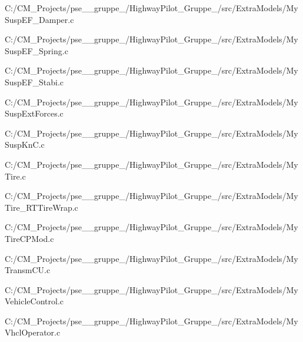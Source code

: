 \begin{DoxyCompactItemize}
C\+:/\+C\+M\+\_\+\+Projects/pse\+\_\+\_\+gruppe\+\_/\+Highway\+Pilot\+\_\+\+Gruppe\+\_/src/\+Extra\+Models/My\+Susp\+E\+F\+\_\+\+Damper.\+c\item 
C\+:/\+C\+M\+\_\+\+Projects/pse\+\_\+\_\+gruppe\+\_/\+Highway\+Pilot\+\_\+\+Gruppe\+\_/src/\+Extra\+Models/My\+Susp\+E\+F\+\_\+\+Spring.\+c\item 
C\+:/\+C\+M\+\_\+\+Projects/pse\+\_\+\_\+gruppe\+\_/\+Highway\+Pilot\+\_\+\+Gruppe\+\_/src/\+Extra\+Models/My\+Susp\+E\+F\+\_\+\+Stabi.\+c\item 
C\+:/\+C\+M\+\_\+\+Projects/pse\+\_\+\_\+gruppe\+\_/\+Highway\+Pilot\+\_\+\+Gruppe\+\_/src/\+Extra\+Models/My\+Susp\+Ext\+Forces.\+c\item 
C\+:/\+C\+M\+\_\+\+Projects/pse\+\_\+\_\+gruppe\+\_/\+Highway\+Pilot\+\_\+\+Gruppe\+\_/src/\+Extra\+Models/My\+Susp\+Kn\+C.\+c\item 
C\+:/\+C\+M\+\_\+\+Projects/pse\+\_\+\_\+gruppe\+\_/\+Highway\+Pilot\+\_\+\+Gruppe\+\_/src/\+Extra\+Models/My\+Tire.\+c\item 
C\+:/\+C\+M\+\_\+\+Projects/pse\+\_\+\_\+gruppe\+\_/\+Highway\+Pilot\+\_\+\+Gruppe\+\_/src/\+Extra\+Models/My\+Tire\+\_\+\+R\+T\+Tire\+Wrap.\+c\item 
C\+:/\+C\+M\+\_\+\+Projects/pse\+\_\+\_\+gruppe\+\_/\+Highway\+Pilot\+\_\+\+Gruppe\+\_/src/\+Extra\+Models/My\+Tire\+C\+P\+Mod.\+c\item 
C\+:/\+C\+M\+\_\+\+Projects/pse\+\_\+\_\+gruppe\+\_/\+Highway\+Pilot\+\_\+\+Gruppe\+\_/src/\+Extra\+Models/My\+Transm\+C\+U.\+c\item 
C\+:/\+C\+M\+\_\+\+Projects/pse\+\_\+\_\+gruppe\+\_/\+Highway\+Pilot\+\_\+\+Gruppe\+\_/src/\+Extra\+Models/My\+Vehicle\+Control.\+c\item 
C\+:/\+C\+M\+\_\+\+Projects/pse\+\_\+\_\+gruppe\+\_/\+Highway\+Pilot\+\_\+\+Gruppe\+\_/src/\+Extra\+Models/My\+Vhcl\+Operator.\+c\end{DoxyCompactItemize}
